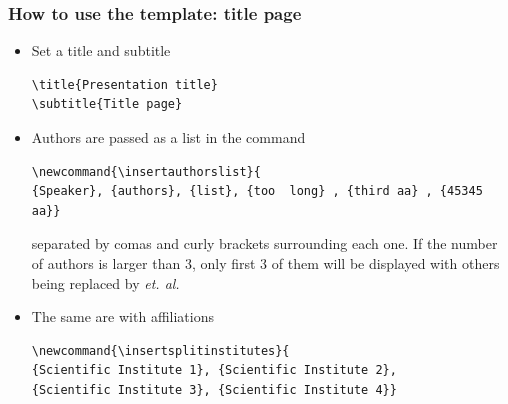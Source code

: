 \documentclass[aspectratio=169, 18pt]{beamer}
\newcommand{\insertauthorslist}{
{Speaker}, {authors}, {list}, {too  long} , {third aa} , {45345 aa}}
\newcommand{\insertsplitinstitutes}{
{Scientific Institute 1}, {Scientific Institute 2}, {Scientific Institute 3}, {Scientific Institute 4}
}
\begin{document}
	\FrameStyleTwo
	\begin{frame}[fragile]
		\frametitle{How to use the template: title page}
		\vspace{0.8cm}
		
		\begin{itemize}
		\item  Set a title and subtitle
		\begin{verbatim}
\title{Presentation title}
\subtitle{Title page}
		\end{verbatim}
		\item Authors are passed as a list in the command 
		\begin{verbatim}
\newcommand{\insertauthorslist}{
{Speaker}, {authors}, {list}, {too  long} , {third aa} , {45345 aa}}
		\end{verbatim}
		separated by comas and curly brackets surrounding each one. If the number of authors is larger than 3, only first 3 of them will be displayed with others being replaced by \textcolor{maingreen}{\textit{et. al.}}
		\item The same are with affiliations
		\begin{verbatim}
\newcommand{\insertsplitinstitutes}{
{Scientific Institute 1}, {Scientific Institute 2},
{Scientific Institute 3}, {Scientific Institute 4}}
		\end{verbatim}
	\end{itemize}
		
	\end{frame}
\end{document}
